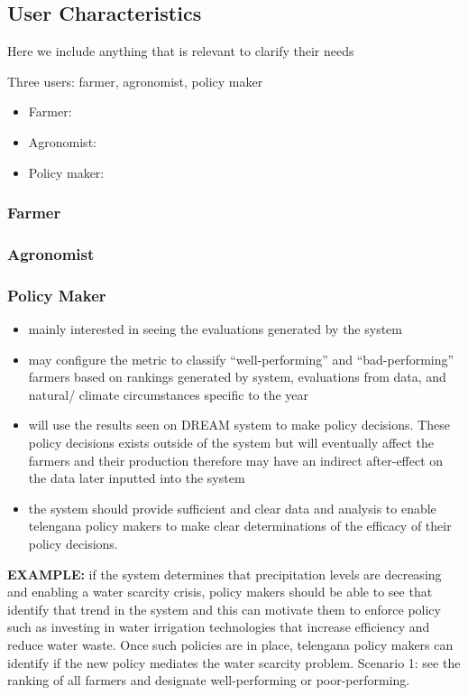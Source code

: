 

\subsection{User Characteristics}
\begin{flushleft}

Here we include anything that is relevant to clarify their needs 
\par
Three users: farmer, agronomist, policy maker
\begin{itemize}
\item Farmer:
\item Agronomist:
\item Policy maker:
\end{itemize}

\subsubsection{Farmer}
\subsubsection{Agronomist}
\subsubsection{Policy Maker}

\begin{itemize}
\item
mainly interested in seeing the evaluations generated by the system
\item 
may configure the metric to classify “well-performing” and “bad-performing” farmers based on rankings generated by system, evaluations from data, and natural/ climate circumstances specific to the year 
\item
will use the results seen on DREAM system to make policy decisions. These policy decisions exists outside of the system but will eventually affect the farmers and their production therefore may have an indirect after-effect on the data later inputted into the system
\item
the system should provide sufficient and clear data and analysis to enable telengana policy makers to make clear determinations of the efficacy of their policy decisions. 
\end{itemize}


\textbf{EXAMPLE:} if the system determines that precipitation levels are decreasing and enabling a water scarcity crisis, policy makers should be able to see that identify that trend in the system and this can motivate them to enforce policy such as investing in water irrigation technologies that increase efficiency and reduce water waste. Once such policies are in place, telengana policy makers can identify if the new policy mediates the water scarcity problem. 
Scenario 1: see the ranking of all farmers and designate well-performing or poor-performing.\\


\end{flushleft}
